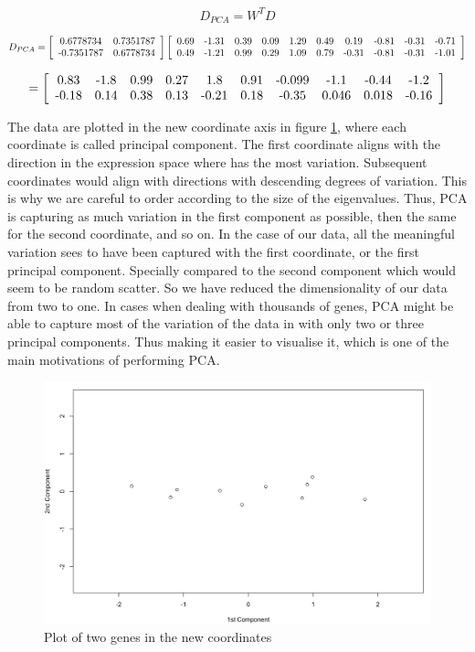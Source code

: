 \documentclass[11pt, oneside]{article}   	%
\begin{document}
\[
   D_{PCA} = W^T D
\]

\[
   D_{PCA} = 
   \left[ \begin{array}{cc}
	0.6778734 & 0.7351787 \\
	$-0.7351787$ & 0.6778734
   \end{array} \right]
   \left[ \begin{array}{cccccccccc}
      0.69 & $-1.31$ & 0.39 & 0.09 & 1.29 & 0.49 & 0.19 & $-0.81$ & $-0.31$ & $-0.71$ \\
      0.49 & $-1.21$ & 0.99 & 0.29 & 1.09 & 0.79 & $-0.31$ & $-0.81$ & $-0.31$ & $-1.01$
   \end{array} \right]
\]

\[
   =
   \left[ \begin{array}{cccccccccc}
      0.83 & $-1.8$ & 0.99 & 0.27 & 1.8 & 0.91 & $-0.099$ & $-1.1$ & $-0.44$ & $-1.2$ \\
      $-0.18$ & 0.14 & 0.38 & 0.13 & $-0.21$ & 0.18 & $-0.35$ & 0.046 & 0.018 & $-0.16$
   \end{array} \right]
\]


The data are plotted in the new coordinate axis in figure \ref{fig:PlotTwoGenesNewCoordiantes}, where each coordinate is called principal component. 
The first coordinate aligns with the direction in the expression space where has the most variation. Subsequent coordinates would align with directions with descending degrees of variation. This is why we are careful to order according to the size of the eigenvalues.
Thus, PCA is capturing as much variation in the first component as possible, then the same for the second coordinate, and so on.
In the case of our data, all the meaningful variation sees to have been captured with the first coordinate, or the first principal component. Specially compared to the second component which would seem to be random scatter. So we have reduced the dimensionality of our data from two to one. In cases when dealing with thousands of genes, PCA might be able to capture most of the variation of the data in with only two or three principal components. Thus making it easier to visualise it, which is one of the main motivations of performing PCA.


\begin{figure}[!h]
	\includegraphics[width=\textwidth]{example1_plot_2PC}
	\caption{Plot of two genes in the new coordinates}
	\label{fig:PlotTwoGenesNewCoordiantes}
\end{figure}
\end{document}
